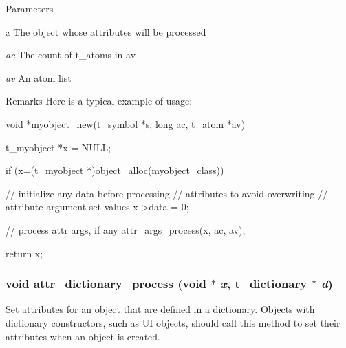 \begin{DoxyParams}{Parameters}
\item[{\em x}]The object whose attributes will be processed \item[{\em ac}]The count of t\_\-atoms in {\ttfamily av} \item[{\em av}]An atom list\end{DoxyParams}
\begin{DoxyRemark}{Remarks}
Here is a typical example of usage: 
\begin{DoxyCode}
    void *myobject_new(t_symbol *s, long ac, t_atom *av)
    {
        t_myobject *x = NULL;

        if (x=(t_myobject *)object_alloc(myobject_class))
        {
            // initialize any data before processing
            // attributes to avoid overwriting 
            // attribute argument-set values
            x->data = 0; 

            // process attr args, if any
            attr_args_process(x, ac, av);
        }
        return x;
    }
\end{DoxyCode}
 
\end{DoxyRemark}
\hypertarget{group__attr_ga3109d643addc97cb6a07785a9170e2e3}{
\subsubsection[{attr\_\-dictionary\_\-process}]{\setlength{\rightskip}{0pt plus 5cm}void attr\_\-dictionary\_\-process (void $\ast$ {\em x}, \/  {\bf t\_\-dictionary} $\ast$ {\em d})}}
\label{group__attr_ga3109d643addc97cb6a07785a9170e2e3}


Set attributes for an object that are defined in a dictionary. Objects with dictionary constructors, such as UI objects, should call this method to set their attributes when an object is created.


